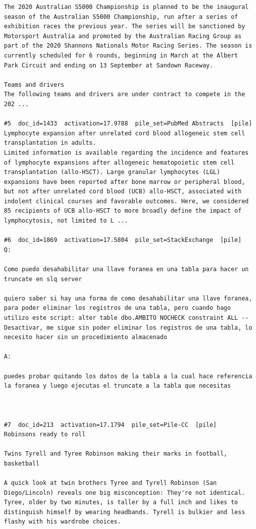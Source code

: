 \begin{verbatim}
The 2020 Australian S5000 Championship is planned to be the inaugural season of the Australian S5000 Championship, run after a series of exhibition races the previous year. The series will be sanctioned by Motorsport Australia and promoted by the Australian Racing Group as part of the 2020 Shannons Nationals Motor Racing Series. The season is currently scheduled for 6 rounds, beginning in March at the Albert Park Circuit and ending on 13 September at Sandown Raceway.

Teams and drivers 
The following teams and drivers are under contract to compete in the 202 ...

#5  doc_id=1433  activation=17.9788  pile_set=PubMed Abstracts  [pile]
Lymphocyte expansion after unrelated cord blood allogeneic stem cell transplantation in adults.
Limited information is available regarding the incidence and features of lymphocyte expansions after allogeneic hematopoietic stem cell transplantation (allo-HSCT). Large granular lymphocytes (LGL) expansions have been reported after bone marrow or peripheral blood, but not after unrelated cord blood (UCB) allo-HSCT, associated with indolent clinical courses and favorable outcomes. Here, we considered 85 recipients of UCB allo-HSCT to more broadly define the impact of lymphocytosis, not limited to L ...

#6  doc_id=1869  activation=17.5804  pile_set=StackExchange  [pile]
Q:

Como puedo desahabilitar una llave foranea en una tabla para hacer un truncate en slq server

quiero saber si hay una forma de como desahabilitar una llave foranea, para poder eliminar los registros de una tabla, pero cuando hago utilizo este script: alter table dbo.AMBITO NOCHECK constraint ALL --Desactivar, me sigue sin poder eliminar los registros de una tabla, lo necesito hacer sin un procedimiento almacenado 

A:

puedes probar quitando los datos de la tabla a la cual hace referencia la foranea y luego ejecutas el truncate a la tabla que necesitas



#7  doc_id=213  activation=17.1794  pile_set=Pile-CC  [pile]
Robinsons ready to roll

Twins Tyrell and Tyree Robinson making their marks in football, basketball

A quick look at twin brothers Tyree and Tyrell Robinson (San Diego/Lincoln) reveals one big misconception: They're not identical. Tyree, older by two minutes, is taller by a full inch and likes to distinguish himself by wearing headbands. Tyrell is bulkier and less flashy with his wardrobe choices.


\end{verbatim}
